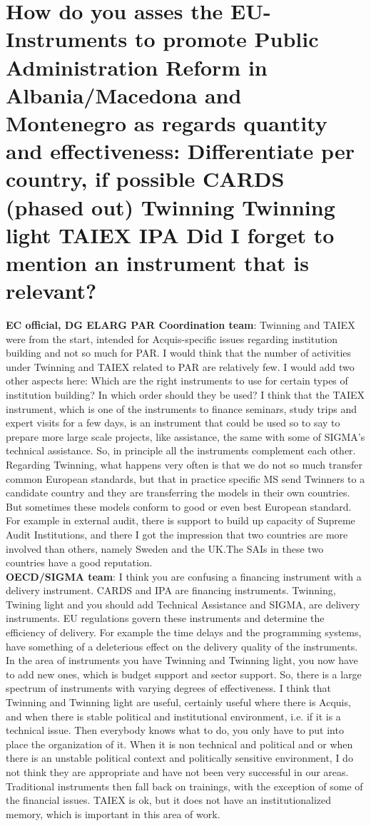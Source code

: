 \section{How do you asses the EU-Instruments to promote Public Administration Reform in
Albania/Macedona and Montenegro as regards quantity and effectiveness: Differentiate per country, if possible CARDS (phased out) Twinning Twinning light TAIEX IPA Did I forget to mention an instrument that is relevant? }
\textbf{EC official, DG ELARG PAR Coordination team}: Twinning and TAIEX were from the start, intended for Acquis-specific issues regarding institution building and not so much for PAR. I would think that the number of activities under Twinning and TAIEX related to PAR are relatively few. I would add two other aspects here: Which are the right instruments to use for certain types of institution building? In which order should they be used? I think that the TAIEX instrument, which is one of the instruments to finance seminars, study trips and expert visits for a few days, is an instrument that could be used so to say to prepare more large scale projects, like assistance, the same with some of SIGMA's technical assistance. So, in principle all the instruments complement each other. Regarding Twinning, what happens very often is that we do not so much transfer common European standards, but that in practice specific MS send Twinners to a candidate country and they are transferring the models in their own countries. But sometimes these models conform to good or even best European standard. For example in external audit, there is support to build up capacity of Supreme Audit Institutions, and there I got the impression that two countries are more involved than others, namely Sweden and the UK.The SAIs in these two countries have a  good reputation.\\
\textbf{OECD/SIGMA team}: I think you are confusing a financing instrument with a delivery instrument. CARDS and IPA are financing instruments. Twinning, Twining light and you should add Technical Assistance and SIGMA, are delivery instruments. EU regulations govern these instruments and determine the efficiency of delivery. For example the time delays and the programming systems, have something of a deleterious effect on the delivery quality of the instruments. In the area of instruments you have Twinning and Twinning light, you now have to add new ones, which is budget support and sector support. So, there is a large spectrum of instruments with varying degrees of effectiveness. I think that Twinning and Twinning light are useful, certainly useful where there is Acquis, and when there is stable political and institutional environment, i.e. if it is a technical issue. Then everybody knows what to do, you only have to put into place the organization of it. When it is non technical and political and or when there is an unstable political context and politically sensitive environment, I do not think they are appropriate and have not been very successful in our areas. Traditional instruments then fall back on trainings, with the exception of some of the financial issues. TAIEX is ok, but it does not have an institutionalized memory, which is important in this area of work.
